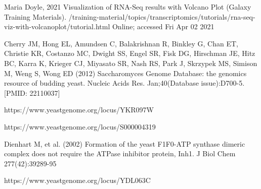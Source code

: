\documentclass{article}
\begin{document}
\begin{thebibliography}{9}
Maria Doyle, 2021 Visualization of RNA-Seq results with Volcano Plot (Galaxy Training Materials). /training-material/topics/transcriptomics/tutorials/rna-seq-viz-with-volcanoplot/tutorial.html Online; accessed Fri Apr 02 2021

Cherry JM, Hong EL, Amundsen C, Balakrishnan R, Binkley G, Chan ET, Christie KR, Costanzo MC, Dwight SS, Engel SR, Fisk DG, Hirschman JE, Hitz BC, Karra K, Krieger CJ, Miyasato SR, Nash RS, Park J, Skrzypek MS, Simison M, Weng S, Wong ED (2012) Saccharomyces Genome Database: the genomics resource of budding yeast. Nucleic Acids Res. Jan;40(Database issue):D700-5. [PMID: 22110037]

 
 https://www.yeastgenome.org/locus/YKR097W
 
https://www.yeastgenome.org/locus/S000004319

 Dienhart M, et al. (2002) Formation of the yeast F1F0-ATP synthase dimeric complex does not require the ATPase inhibitor protein, Inh1. J Biol Chem 277(42):39289-95

https://www.yeastgenome.org/locus/YDL063C

\end{thebibliography}

  
\end{document}
